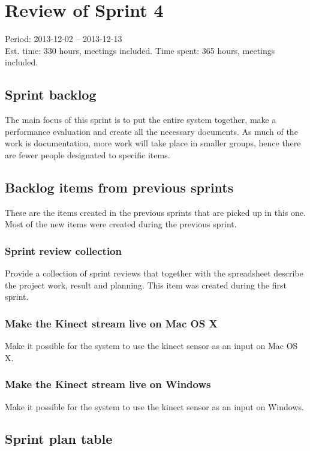 \section{Review of Sprint 4}
\label{sec:sprint4}
\large Period: 2013-12-02 -- 2013-12-13 \\ 
\large Est. time: 330 hours, meetings included.
\large Time spent: 365 hours, meetings included.

\subsection{Sprint backlog}
The main focus of this sprint is to put the entire system together, make a performance evaluation and create all the necessary documents. As much of the work is documentation, more work will take place in smaller groups, hence there are fewer people designated to specific items.

\subsection{Backlog items from previous sprints}
These are the items created in the previous sprints that are picked up in this one. Most of the new items were created during the previous sprint.

\subsubsection{Sprint review collection}
Provide a collection of sprint reviews that together with the spreadsheet describe the project work, result and planning. This item was created during the first sprint.

\subsubsection{Make the Kinect stream live on Mac OS X}
Make it possible for the system to use the kinect sensor as an input on Mac OS X.

\subsubsection{Make the Kinect stream live on Windows}
Make it possible for the system to use the kinect sensor as an input on Windows.



\newpage

\subsection{Sprint plan table}

